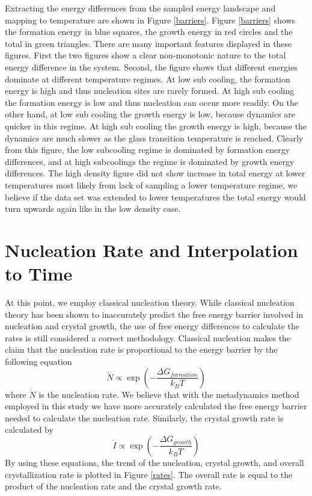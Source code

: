 Extracting the energy differences from the sampled energy landscape and mapping to temperature are shown in Figure \ref{barriers}.  Figure \ref{barriers} shows the formation energy in blue squares, the growth energy in red circles and the total in green triangles.  There are many important features displayed in these figures.  First the two figures show a clear non-monotonic nature to the total energy difference in the system.  Second, the figure shows that different energies dominate at different temperature regimes.  At low sub cooling, the formation energy is high and thus nucleation sites are rarely formed.  At high sub cooling the formation energy is low and thus nucleation can occur more readily.  On the other hand, at low sub cooling the growth energy is low, because dynamics are quicker in this regime.  At high sub cooling the growth energy is high, because the dynamics are much slower as the glass transition temperature is reached.  Clearly from this figure, the low subcooling regime is dominated by formation energy differences, and at high subcoolings the regime is dominated by growth energy differences.  The high density figure did not show increase in total energy at lower temperatures most likely from lack of sampling a lower temperature regime, we believe if the data set was extended to lower temperatures the total energy would turn upwards again like in the low density case.

\section{Nucleation Rate and Interpolation to Time}
At this point, we employ classical nucleation theory.  While classical nucleation theory has been shown to inaccurately predict the free energy barrier involved in nucleation and crystal growth, the use of free energy differences to calculate the rates is still considered a correct methodology.  Classical nucleation makes the claim that the nucleation rate is proportional to the energy barrier by the following equation
\begin{equation}
\dot{N} \propto \exp\left( -\frac{\Delta G_{formation}}{k_BT}\right)
\end{equation}
where $\dot{N}$ is the nucleation rate.  We believe that with the metadynamics method employed in this study we have more accurately calculated the free energy barrier needed to calculate the nucleation rate.  Similarly, the crystal growth rate is calculated by
\begin{equation}
\dot{I} \propto \exp\left( -\frac{\Delta G_{growth}}{k_BT}\right)
\end{equation}
By using these equations, the trend of the nucleation, crystal growth, and overall crystallization rate is plotted in Figure \ref{rates}.  The overall rate is equal to the product of the nucleation rate and the crystal growth rate.

